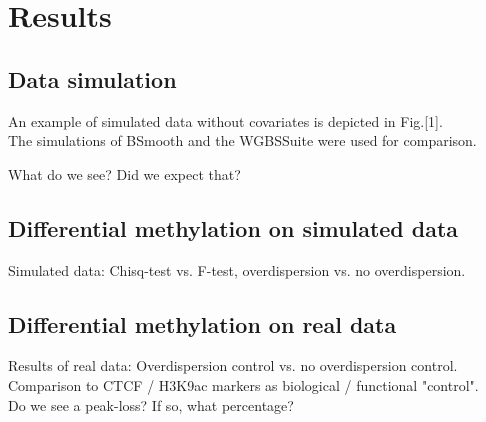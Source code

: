 \section{Results}

\subsection{Data simulation}
An example of simulated data without covariates is depicted in Fig.[1].\\
The simulations of BSmooth \cite{23034175} and the WGBSSuite \cite{25777524} were used for comparison.

What do we see? Did we expect that?

\subsection{Differential methylation on simulated data}
Simulated data: Chisq-test vs. F-test, overdispersion vs. no overdispersion.

\subsection{Differential methylation on real data}
Results of real data: Overdispersion control vs. no overdispersion control.\\
Comparison to CTCF / H3K9ac markers as biological / functional "control".\\
Do we see a peak-loss? If so, what percentage?
  
  
  
  
  